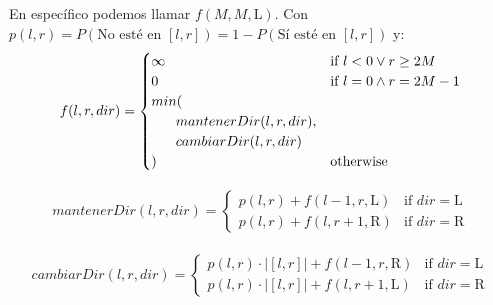 \documentclass[../main.tex]{subfiles}
\begin{document}
\begin{frame}
  \frametitle{\SECTIONB}
  \framesubtitle{\EJB}

  En específico podemos llamar \(f(M, M, \text{L})\). Con \(p(l, r) = P(\text{No esté en } [l, r]) = 1 - P(\text{Sí esté en } [l, r])\) y:
  \begin{gather*}
    f(l, r, dir) = \begin{cases}
      \infty & \text{if } l < 0 \lor r \geq 2M \\
      0 & \text{if } l = 0 \land r = 2M-1 \\
      min( \\
      \tab mantenerDir(l, r, dir), \\
      \tab cambiarDir(l, r, dir) \\
      ) & \text{otherwise}
    \end{cases}
  \end{gather*}

  \begin{gather*}
    mantenerDir(l, r, dir) = \begin{cases}
      p(l, r) + f(l-1, r, \text{L}) & \text{if } dir = \text{L} \\
      p(l, r) + f(l, r+1, \text{R}) & \text{if } dir = \text{R}
    \end{cases}
  \end{gather*}

  \begin{gather*}
    cambiarDir(l, r, dir) = \begin{cases}
      p(l, r) \cdot |[l, r]| + f(l-1, r, \text{R}) & \text{if } dir = \text{L} \\
      p(l, r) \cdot |[l, r]| + f(l, r+1, \text{L}) & \text{if } dir = \text{R}
    \end{cases}
  \end{gather*}
\end{frame}
\end{document}
